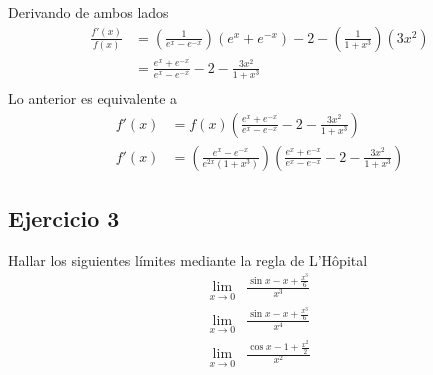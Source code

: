 \documentclass[a4paper]{article}
\begin{document}
Derivando de ambos lados
\begin{align*}
    \frac{f'(x)}{f(x)} &= \left(\frac{1}{e^{x} - e^{-x}}\right)\left(e^{x} + e^{-x}\right) - 2 - \left(\frac{1}{1 + x^3}\right)\left(3x^2\right) \\
                       &= \frac{e^{x} + e^{-x}}{e^{x} - e^{-x}} - 2 - \frac{3x^2}{1 + x^3} \\
\end{align*}
Lo anterior es equivalente a
\begin{align*}
    f'(x) &= f(x) \left(\frac{e^{x} + e^{-x}}{e^{x} - e^{-x}} - 2 - \frac{3x^2}{1 + x^3}\right) \\
    f'(x) &= \left(\frac{e^{x} - e^{-x}}{e^{2x}(1 + x^3)}\right)\left(\frac{e^{x} + e^{-x}}{e^{x} - e^{-x}} - 2 - \frac{3x^2}{1 + x^3}\right)
\end{align*}
\subsection{Ejercicio 3}
\noindent
Hallar los siguientes límites mediante la regla de L'Hôpital
\begin{align*}
    \lim_{x \to 0} &\frac{\sin{x} - x + \frac{x^3}{6}}{x^3} \\
    \lim_{x \to 0} &\frac{\sin{x} - x + \frac{x^3}{6}}{x^4} \\
    \lim_{x \to 0} &\frac{\cos{x} - 1 + \frac{x^2}{2}}{x^2} \\
\end{align*}
\end{document}
